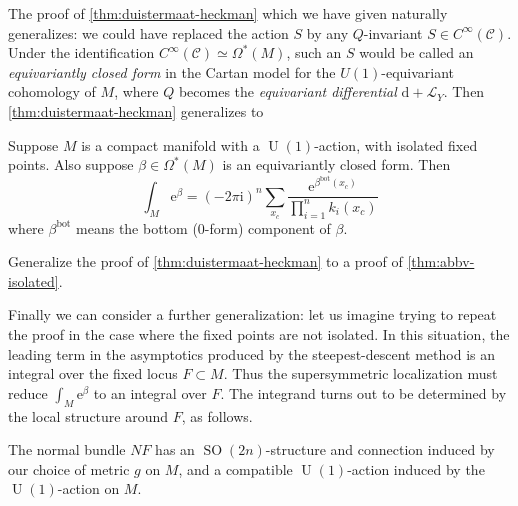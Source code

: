 \documentclass[12pt,letterpaper,reqno]{article}
\numberwithin{equation}{section}
\newcommand{\cC}{\ensuremath{\mathcal C}}
\newcommand{\cL}{\ensuremath{\mathcal L}}
\newcommand{\I}{{\mathrm i}}
\newcommand{\e}{{\mathrm e}}
\newcommand{\de}{\mathrm{d}}
\newcommand{\rmbot}{\mathrm{bot}}
\newcommand{\ti}[1]{\textit{#1}}
\DeclareMathOperator{\SO}{SO}
\DeclareMathOperator{\U}{U}
\newcommand{\fixme}[1]{{\color{orange}{[#1]}}}
\begin{document}
The proof of \autoref{thm:duistermaat-heckman} which we have
given naturally generalizes: we could have replaced the action $S$
by any $Q$-invariant $S \in C^\infty(\cC)$.
Under the identification $C^\infty(\cC) \simeq \Omega^*(M)$,
such an $S$ would be called an \ti{equivariantly closed form}
in the Cartan model for the $U(1)$-equivariant cohomology of $M$,
where $Q$ becomes the \ti{equivariant differential} $\de + \cL_Y$.
Then \autoref{thm:duistermaat-heckman} generalizes to

\begin{thm} \label{thm:abbv-isolated}
Suppose $M$ is a compact manifold with a $\U(1)$-action, with isolated
fixed points.
Also suppose $\beta \in \Omega^*(M)$ is an equivariantly closed form.
Then
\begin{equation}
\int_M \e^{\beta} = \left( -2\pi \I \right)^{n} \sum_{x_c} \frac{\e^{\beta^\rmbot(x_c)}}{\prod_{i=1}^n k_i(x_c)}
\end{equation}
where $\beta^\rmbot$ means the bottom ($0$-form) component
of $\beta$.
\end{thm}

\begin{exercise} Generalize the proof
of \autoref{thm:duistermaat-heckman} to a proof of \autoref{thm:abbv-isolated}.
\end{exercise}

Finally we can consider a further generalization: let us imagine 
trying to repeat the proof in the case where the fixed points
are not isolated.
In this situation, the leading term in the asymptotics
produced by the steepest-descent method is an integral over the 
fixed locus $F \subset M$.
Thus the supersymmetric localization must reduce $\int_M \e^\beta$
to an integral over $F$. The integrand turns out to be determined by the
local structure around $F$, as follows.

The normal bundle $NF$
has an $\SO(2n)$-structure and connection 
induced by our choice of metric $g$ on $M$,
and a compatible $\U(1)$-action induced by the $\U(1)$-action 
on $M$. \fixme{worry about orientations}
\end{document}
